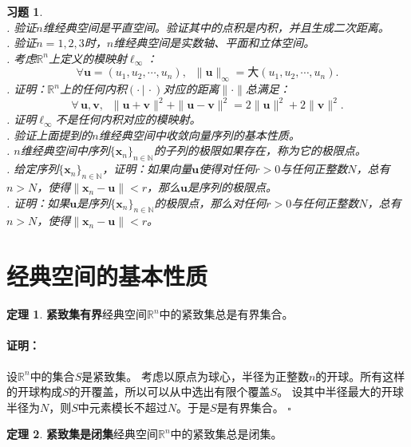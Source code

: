 \documentclass[12pt,UTF8]{ctexbook}
\newcommand{\nji}[2]{\displaystyle\left( #1 \,|\, #2\right)}
\theoremstyle{definition}
\newtheorem{tm}{定理}[section]
\theoremstyle{plain}
\newtheorem{xt}{习题}[section]
\renewenvironment{proof}{\paragraph{\textbf{证明：}}}{\hfill$\square$}
\begin{document}
\begin{appendix}
\begin{xt}
    \mbox{}\\
    . 验证$n$维经典空间是平直空间。验证其中的点积是内积，并且生成二次距离。\\
    . 验证$n=1,2,3$时，$n$维经典空间是实数轴、平面和立体空间。\\
    . 考虑$\mathbb{R}^n$上定义的模映射$\ell_{\infty}$：
    $$ \forall \mathbf{u} = (u_1, u_2, \cdots, u_n), \;\; \| \mathbf{u} \|_{\infty} = \text{大}(u_1, u_2, \cdots, u_n).$$
    . 证明：$\mathbb{R}^n$上的任何内积$\nji{\cdot}{\cdot}$对应的距离$\|\cdot \|$总满足：
    $$\forall \, \mathbf{u}, \mathbf{v},\;\; \|\mathbf{u} + \mathbf{v}\|^2 + \|\mathbf{u} - \mathbf{v}\|^2 = 2\|\mathbf{u}\|^2 + 2\|\mathbf{v}\|^2. $$
    . 证明$\ell_{\infty}$不是任何内积对应的模映射。\\
    . 验证上面提到的$n$维经典空间中收敛向量序列的基本性质。\\
    . $n$维经典空间中序列$\{\mathbf{x}_n\}_{n\in\mathbb{N}}$的子列的极限如果存在，称为它的极限点。\\
    . 给定序列$\{\mathbf{x}_n\}_{n\in\mathbb{N}}$，证明：如果向量$\mathbf{u}$使得对任何$r>0$与任何正整数$N$，总有$n>N$，使得$\|\mathbf{x}_n - \mathbf{u}\| < r$，那么$\mathbf{u}$是序列的极限点。\\
    . 证明：如果$\mathbf{u}$是序列$\{\mathbf{x}_n\}_{n\in\mathbb{N}}$的极限点，那么对任何$r>0$与任何正整数$N$，总有$n>N$，使得$\|\mathbf{x}_n - \mathbf{u}\| < r$。\\

\end{xt}

\section{经典空间的基本性质}

\begin{tm}{\textbf{紧致集有界}}\label{tm:b-2-0}
    经典空间$\mathbb{R}^n$中的紧致集总是有界集合。
\end{tm}

\begin{proof}
    设$\mathbb{R}^n$中的集合$S$是紧致集。
    考虑以原点为球心，半径为正整数$n$的开球。所有这样的开球构成$S$的开覆盖，所以可以从中选出有限个覆盖$S$。
    设其中半径最大的开球半径为$N$，则$S$中元素模长不超过$N$。于是$S$是有界集合。
\end{proof}

\begin{tm}{\textbf{紧致集是闭集}}\label{tm:b-2-10}
    经典空间$\mathbb{R}^n$中的紧致集总是闭集。
\end{tm}


\end{appendix}
\end{document}
